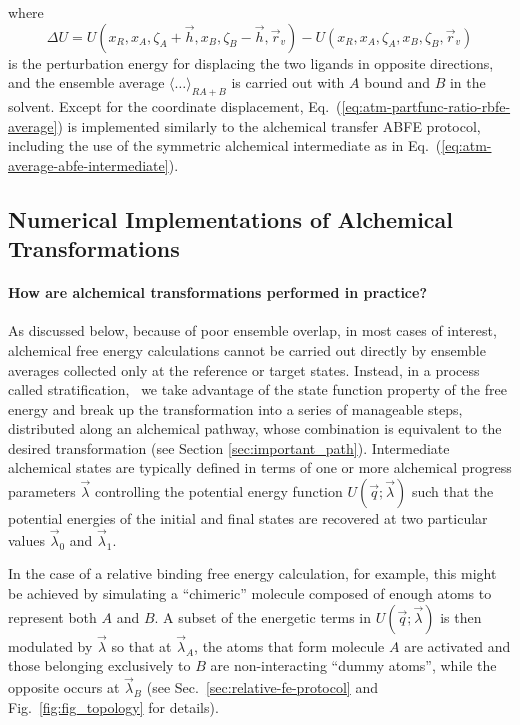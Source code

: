 \documentclass[9pt,bestpractices]{livecoms}
\begin{document}
where
\begin{equation}\label{eq:atm-partfunc-ratio-rbfe-pert}
\Delta U = U(x_R, x_A, \zeta_A + \vec{h}, x_B, \zeta_B - \vec{h}, \vec{r}_v) - U(x_R, x_A, \zeta_A, x_B, \zeta_B, \vec{r}_v)
\end{equation}
is the perturbation energy for displacing the two ligands in opposite directions, and the ensemble average $\langle \ldots \rangle_{RA+B}$ is carried out with $A$ bound and $B$ in the solvent. Except for the coordinate displacement, Eq.~(\ref{eq:atm-partfunc-ratio-rbfe-average}) is implemented similarly to the alchemical transfer ABFE protocol, including the use of the symmetric alchemical intermediate as in Eq.~(\ref{eq:atm-average-abfe-intermediate}).

\subsection{Numerical Implementations of Alchemical Transformations}
\label{subsec:numerical-implementations}

\paragraph{How are alchemical transformations performed in practice?}

As discussed below, because of poor ensemble overlap, in most cases of interest, alchemical free energy calculations cannot be carried out directly by ensemble averages collected only at the reference or target states. Instead, in a process called stratification,~\cite{chipot2007free} we take advantage of the state function property of the free energy and break up the transformation into a series of manageable steps, distributed along an alchemical pathway, whose combination is equivalent to the desired transformation (see Section \ref{sec:important_path}). Intermediate alchemical states are typically defined in terms of one or more alchemical progress parameters $\vec{\lambda}$ controlling the potential energy function $U(\vec{q};\vec{\lambda})$ such that the potential energies of the initial and final states are recovered at two particular values $\vec{\lambda}_0$ and $\vec{\lambda}_1$.

In the case of a relative binding free energy calculation, for example, this might be achieved by simulating a ``chimeric'' molecule composed of enough atoms to represent both $A$ and $B$. A subset of the energetic terms in $U(\vec{q};\vec{\lambda})$ is then modulated by $\vec{\lambda}$ so that at $\vec{\lambda}_A$, the atoms that form molecule $A$ are activated and those belonging exclusively to $B$ are non-interacting ``dummy atoms'', while the opposite occurs at $\vec{\lambda}_B$ (see Sec.~\ref{sec:relative-fe-protocol} and Fig.~\ref{fig:fig_topology} for details).
\end{document}
